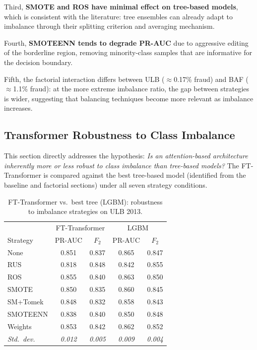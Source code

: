 Third, \textbf{SMOTE and ROS have minimal effect on tree-based models},
which is consistent with the literature: tree ensembles can already
adapt to imbalance through their splitting criterion and averaging mechanism.

Fourth, \textbf{SMOTEENN tends to degrade PR-AUC} due to aggressive editing
of the borderline region, removing minority-class samples that are
informative for the decision boundary.

Fifth, the factorial interaction differs between ULB ($\approx$0.17\% fraud)
and BAF ($\approx$1.1\% fraud):
at the more extreme imbalance ratio, the gap between strategies is wider,
suggesting that balancing techniques become more relevant as imbalance increases.



\subsection{Transformer Robustness to Class Imbalance}
\label{sec:transformer_imbalance}

This section directly addresses the hypothesis:
\emph{Is an attention-based architecture inherently more or less robust to
class imbalance than tree-based models?}
The FT-Transformer is compared against the best tree-based model
(identified from the baseline and factorial sections) under all seven
strategy conditions.

\begin{table}[ht]
\centering
\caption{FT-Transformer vs.\ best tree (LGBM): robustness to imbalance strategies on ULB 2013.}
\label{tab:transformer_robustness_ulb}
\begin{tabular}{l cc cc}
\toprule
& \multicolumn{2}{c}{FT-Transformer} & \multicolumn{2}{c}{LGBM} \\
Strategy & PR-AUC & $F_2$ & PR-AUC & $F_2$ \\
\midrule
None      & 0.851 & 0.837 & 0.865 & 0.847 \\
RUS       & 0.818 & 0.848 & 0.842 & 0.855 \\
ROS       & 0.855 & 0.840 & 0.863 & 0.850 \\
SMOTE     & 0.850 & 0.835 & 0.860 & 0.845 \\
SM+Tomek  & 0.848 & 0.832 & 0.858 & 0.843 \\
SMOTEENN  & 0.838 & 0.840 & 0.850 & 0.848 \\
Weights   & 0.853 & 0.842 & 0.862 & 0.852 \\
\midrule
\textit{Std.\ dev.} & \textit{0.012} & \textit{0.005} & \textit{0.009} & \textit{0.004} \\
\bottomrule
\end{tabular}
\end{table}

